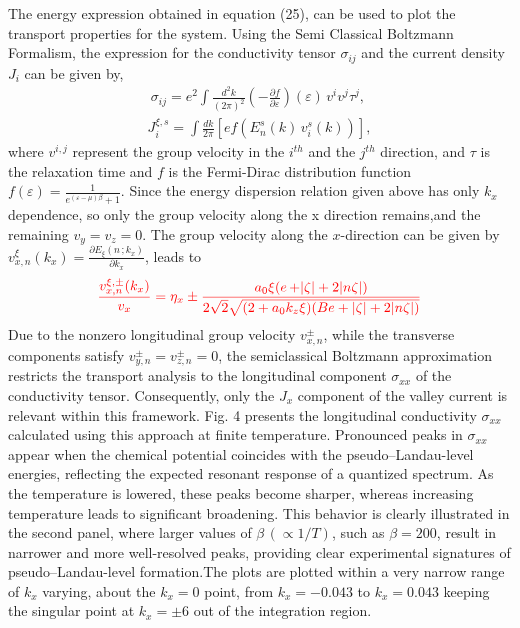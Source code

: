 \documentclass[aps,prb, onecolumn,nofootinbib,citeautoscript,10pt]{revtex4-2}
\begin{document}
The energy expression obtained in equation (25), can be used to plot the transport properties for the system. Using the Semi Classical Boltzmann Formalism, the expression for the conductivity tensor $\sigma_{ij}$ and the current density $J_i$ can be given by,\cite{park2017}
\begin{align}
\sigma_{ij}
=  e^2 \int \frac{d^2 k}{(2\pi)^2}
(-\frac{\partial f}{\partial \varepsilon})(\varepsilon)\,
v^i v^j \tau^j,
\
\end{align}
\begin{align}
J_{i}^{\xi, s}= \int \frac{dk}{2 \pi}[e f(E_n^s(k)\,v_{i}^s(k))],
\end{align}
where $v^{i,j}$ represent the group velocity in the $i^{th}$ and the $j^{th}$ direction, and $\tau$ is the relaxation time and $f$ is the Fermi-Dirac distribution function $f(\varepsilon)
= \frac{1}{e^{(\varepsilon - \mu)\beta} + 1}
$. Since the energy dispersion relation given above has only $k_x$ dependence, so only the group velocity along the x direction remains,and the remaining $v_y=v_z=0$. The group velocity along the $x$-direction can be given by $v_{x,n}^{\xi}(k_x)= \frac{\partial E_{\xi}(n\, ; k_x) }{\partial k_x}$, leads to
\begin{align}
{\color{red}
\frac{v_{x,n}^{\xi, \pm}(k_x)} {v_x}
=   \eta_x \pm \frac{a_0 \xi (e\,\mathcal   + |\zeta| + 2 |n \zeta|)}{2\sqrt{2} \sqrt{(2 + a_0 k_z \xi)(B e + |\zeta| + 2|n\zeta|)}} 
}
\end{align}
Due to the nonzero longitudinal group velocity $v_{x,n}^{\pm}$, while the transverse components satisfy $v_{y,n}^{\pm}=v_{z,n}^{\pm}=0$, the semiclassical Boltzmann approximation restricts the transport analysis to the longitudinal component $\sigma_{xx}$ of the conductivity tensor. Consequently, only the $J_x$ component of the valley current is relevant within this framework.
Fig. 4 presents the longitudinal conductivity $\sigma_{xx}$ calculated using this approach at finite temperature. Pronounced peaks in 
$\sigma_{xx}$ appear when the chemical potential coincides with the pseudo--Landau-level energies, reflecting the expected resonant response of a quantized spectrum. As the temperature is lowered, these peaks become sharper, whereas increasing temperature leads to significant broadening. This behavior is clearly illustrated in the second panel, where larger values of $\beta \, (\propto 1/T)$, such as $\beta = 200$, result in narrower and more well-resolved peaks, providing clear experimental signatures of pseudo--Landau-level formation.The plots are plotted within a very narrow range of $k_x$ varying, about the $k_x=0$ point, from $k_x= -0.043$ to $k_x=0.043$ keeping the singular point at $k_x=\pm 6$ out of the integration region.
\end{document}
